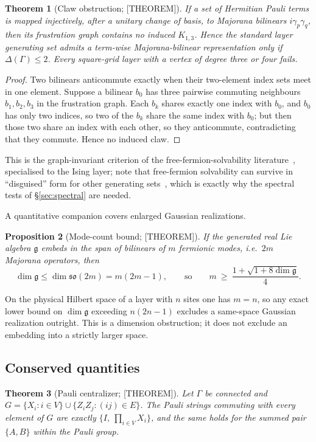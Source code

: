 \documentclass[11pt]{article}
\newtheorem{theorem}{Theorem}[section]
\newtheorem{proposition}[theorem]{Proposition}
\theoremstyle{definition}
\newcommand{\alg}{\mathfrak{g}}
\begin{document}
\begin{theorem}[Claw obstruction; {[THEOREM]}]\label{thm:claw}
If a set of Hermitian Pauli terms is mapped injectively, after a unitary change of basis, to Majorana
bilinears $i\gamma_p\gamma_q$, then its frustration graph contains no induced $K_{1,3}$. Hence the
standard layer generating set admits a term-wise Majorana-bilinear representation only if
$\Delta(\Gamma)\le2$. Every square-grid layer with a vertex of degree three or four fails.
\end{theorem}

\begin{proof}
Two bilinears anticommute exactly when their two-element index sets meet in one element. Suppose a
bilinear $b_0$ has three pairwise commuting neighbours $b_1,b_2,b_3$ in the frustration graph. Each
$b_k$ shares exactly one index with $b_0$, and $b_0$ has only two indices, so two of the $b_k$ share
the same index with $b_0$; but then those two share an index with each other, so they anticommute,
contradicting that they commute. Hence no induced claw.
\end{proof}

This is the graph-invariant criterion of the free-fermion-solvability
literature~\cite{chapman2020,elman2021,chapman2023}, specialised to the Ising layer; note that
free-fermion solvability can survive in ``disguised'' form for other generating
sets~\cite{fendley2019}, which is exactly why the spectral tests of \S\ref{sec:spectral} are needed.

A quantitative companion covers enlarged Gaussian realizations.

\begin{proposition}[Mode-count bound; {[THEOREM]}]\label{prop:modes}
If the generated real Lie algebra $\alg$ embeds in the span of bilinears of $m$ fermionic modes,
i.e.\ $2m$ Majorana operators, then
\[
\dim\alg\le\dim\mathfrak{so}(2m)=m(2m-1),
\qquad\text{so}\qquad
m\ \ge\ \frac{1+\sqrt{1+8\dim\alg}}{4}.
\]
\end{proposition}
On the physical Hilbert space of a layer with $n$ sites one has $m=n$, so any exact lower bound on
$\dim\alg$ exceeding $n(2n-1)$ excludes a same-space Gaussian realization outright. This is a
dimension obstruction; it does not exclude an embedding into a strictly larger space.

\subsection{Conserved quantities}\label{sec:lc}
\begin{theorem}[Pauli centralizer; {[THEOREM]}]\label{thm:flux}
Let $\Gamma$ be connected and $G=\{X_i:i\in V\}\cup\{Z_iZ_j:(ij)\in E\}$. The Pauli strings
commuting with every element of $G$ are exactly $\{I,\ \prod_{i\in V}X_i\}$, and the same holds for
the summed pair $\{A,B\}$ within the Pauli group.
\end{theorem}
\end{document}

